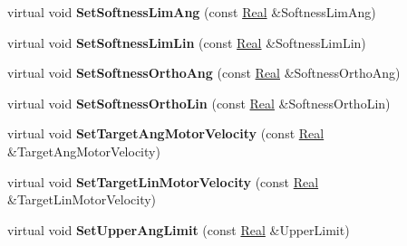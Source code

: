 \begin{DoxyCompactItemize}
\item 
\hypertarget{classMezzanine_1_1SliderConstraint_ad79631afbb0a9bd7ed032a11a03b728a}{
virtual void {\bfseries SetSoftnessLimAng} (const \hyperlink{namespaceMezzanine_a726731b1a7df72bf3583e4a97282c6f6}{Real} \&SoftnessLimAng)}
\label{classMezzanine_1_1SliderConstraint_ad79631afbb0a9bd7ed032a11a03b728a}

\item 
\hypertarget{classMezzanine_1_1SliderConstraint_a70a2fd3912bae1a9c55c55052c97ddef}{
virtual void {\bfseries SetSoftnessLimLin} (const \hyperlink{namespaceMezzanine_a726731b1a7df72bf3583e4a97282c6f6}{Real} \&SoftnessLimLin)}
\label{classMezzanine_1_1SliderConstraint_a70a2fd3912bae1a9c55c55052c97ddef}

\item 
\hypertarget{classMezzanine_1_1SliderConstraint_a925e43c8a9a99bad28cb98d2d2e8ee4a}{
virtual void {\bfseries SetSoftnessOrthoAng} (const \hyperlink{namespaceMezzanine_a726731b1a7df72bf3583e4a97282c6f6}{Real} \&SoftnessOrthoAng)}
\label{classMezzanine_1_1SliderConstraint_a925e43c8a9a99bad28cb98d2d2e8ee4a}

\item 
\hypertarget{classMezzanine_1_1SliderConstraint_a82709e2d8512e09ef7737adf2a623190}{
virtual void {\bfseries SetSoftnessOrthoLin} (const \hyperlink{namespaceMezzanine_a726731b1a7df72bf3583e4a97282c6f6}{Real} \&SoftnessOrthoLin)}
\label{classMezzanine_1_1SliderConstraint_a82709e2d8512e09ef7737adf2a623190}

\item 
\hypertarget{classMezzanine_1_1SliderConstraint_af6e8966ee85122f6cd77aff0fada5cac}{
virtual void {\bfseries SetTargetAngMotorVelocity} (const \hyperlink{namespaceMezzanine_a726731b1a7df72bf3583e4a97282c6f6}{Real} \&TargetAngMotorVelocity)}
\label{classMezzanine_1_1SliderConstraint_af6e8966ee85122f6cd77aff0fada5cac}

\item 
\hypertarget{classMezzanine_1_1SliderConstraint_af4944f66495eb9751a97b819fb6508a4}{
virtual void {\bfseries SetTargetLinMotorVelocity} (const \hyperlink{namespaceMezzanine_a726731b1a7df72bf3583e4a97282c6f6}{Real} \&TargetLinMotorVelocity)}
\label{classMezzanine_1_1SliderConstraint_af4944f66495eb9751a97b819fb6508a4}

\item 
\hypertarget{classMezzanine_1_1SliderConstraint_a8d00ee2581818f554bb101c36c1d3e52}{
virtual void {\bfseries SetUpperAngLimit} (const \hyperlink{namespaceMezzanine_a726731b1a7df72bf3583e4a97282c6f6}{Real} \&UpperLimit)}
\label{classMezzanine_1_1SliderConstraint_a8d00ee2581818f554bb101c36c1d3e52}


\end{DoxyCompactItemize}

